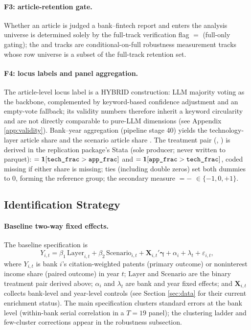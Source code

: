 \paragraph{F3: article-retention gate.}
Whether an article is judged a bank--fintech report and enters the analysis universe is
determined solely by the full-track verification flag
$=$ (full-only gating); the  and
 tracks are conditional-on-full robustness measurement tracks whose row
universe is a subset of the full-track retention set.

\paragraph{F4: locus labels and panel aggregation.}
The article-level locus label is a HYBRID construction: LLM majority voting as the
backbone, complemented by keyword-based confidence adjustment and an empty-vote
fallback; its validity numbers therefore inherit a keyword circularity and are not
directly comparable to pure-LLM dimensions (see Appendix \ref{app:validity}). Bank--year
aggregation (pipeline stage 40) yields the technology-layer article share
 and the scenario article share . The treatment pair
(, ) is derived in the replication
package's Stata  (sole producer; never written to parquet):
$=\mathbf{1}[\texttt{tech\_frac}>\texttt{app\_frac}]$ and
$=\mathbf{1}[\texttt{app\_frac}>\texttt{tech\_frac}]$, coded
missing if either share is missing; ties (including double zeros) set both dummies to 0,
forming the reference group; the secondary measure
$=$$-$
$\in\{-1,0,+1\}$.

\subsection{Identification Strategy}

\paragraph{Baseline two-way fixed effects.}
The baseline specification is
\begin{equation}\label{eq:baseline}
Y_{i,t} = \beta_1\,\mathrm{Layer}_{i,t} + \beta_2\,\mathrm{Scenario}_{i,t}
 + \mathbf{X}_{i,t}'\boldsymbol{\gamma} + \alpha_i + \lambda_t + \varepsilon_{i,t},
\end{equation}
where $Y_{i,t}$ is bank $i$'s citation-weighted patents (primary outcome) or noninterest
income share (paired outcome) in year $t$; $\mathrm{Layer}$ and $\mathrm{Scenario}$ are
the binary treatment pair derived above; $\alpha_i$ and $\lambda_t$ are bank and year
fixed effects; and $\mathbf{X}_{i,t}$ collects bank-level and year-level controls (see
Section \ref{sec:data} for their current enrichment status). The main specification
clusters standard errors at the bank level (within-bank serial correlation in a $T=19$
panel); the clustering ladder and few-cluster corrections appear in the robustness
subsection.

